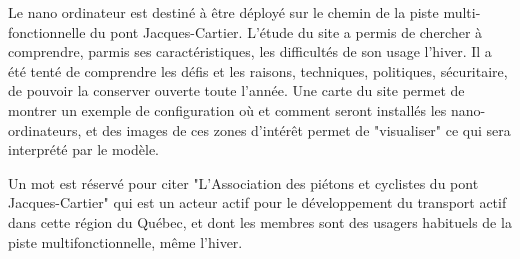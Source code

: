 \par Le nano ordinateur est destiné à être déployé sur le chemin de la piste multi-fonctionnelle du pont Jacques-Cartier. L'étude du site a permis de chercher à comprendre, parmis ses caractéristiques, les difficultés de son usage l'hiver. Il a été tenté de comprendre les défis et les raisons, techniques, politiques, sécuritaire, de pouvoir la conserver ouverte toute l'année. Une carte du site permet de montrer un exemple de configuration où et comment seront installés les nano-ordinateurs, et des images de ces  zones d'intérêt permet de "visualiser" ce qui sera interprété par le modèle. 
\par Un mot est réservé pour citer "L'Association des piétons et cyclistes du pont Jacques-Cartier" qui est un acteur actif pour le développement du transport actif dans cette région du Québec, et dont les membres sont des usagers habituels de la piste multifonctionnelle, même l'hiver.
